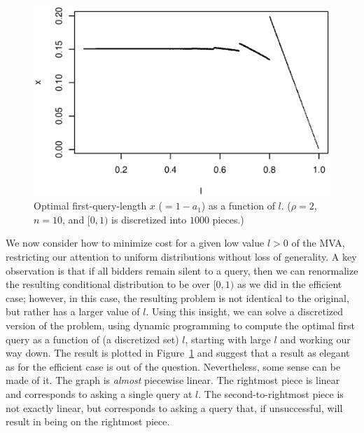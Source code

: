 \begin{figure}
    \includegraphics[trim=0mm 5mm 5mm 15mm, clip, width=\linewidth]{figures/10000-500-2-1-10}
    \caption{Optimal first-query-length $x$ ($=1-a_1$) as a function of
      $l$. ($\rho=2$, $n=10$, and $[0,1)$ is discretized into $1000$ pieces.)}
    \label{fig:x-l}
\end{figure}


We now consider how to minimize cost for a given low value $l>0$ of the
MVA, restricting our attention to uniform distributions without loss of
generality.  A key observation is that if all bidders remain silent to a
query, then we can renormalize the resulting conditional distribution to be
over $[0,1)$ as we did in the efficient case; however, in this case, the
resulting problem is not identical to the original, but rather has a larger
value of $l$.  Using this insight, we can solve a discretized version of
the problem, using dynamic programming to compute the optimal first query
as a function of (a discretized set) $l$, starting with large $l$ and
working our way down.
The result is plotted in Figure~\ref{fig:x-l} and suggest that a result as
elegant as for the efficient case is out of the question.  Nevertheless,
some sense can be made of it.  The graph is {\em almost} piecewise linear.
The rightmost piece is linear and corresponds to asking a single query at
$l$.  The second-to-rightmost piece is not exactly linear, but corresponds
to asking a query that, if unsuccessful, will result in being on the
rightmost piece.

